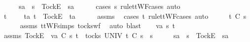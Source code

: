 \ \ \isamarkupfalse%
\ \isamarkupfalse%
\ s{}{\isacharprime}a\ \ {\isachardoublequoteopen}s{}{\isacharprime}\ {\isacharequal}\ {\isacharbrackleft}Tock{\isacharbrackright}\isactrlsub E\ {\isacharhash}\ s{}{\isacharprime}a{\isachardoublequoteclose}\isanewline
\ \ \ \ \isamarkupfalse%
\ {\isacharparenleft}cases\ s{}{\isacharprime}\ rule{\isacharcolon}ttWF{\isachardot}cases{\isacharcomma}\ auto{\isacharparenright}\isanewline
\ \ \isamarkupfalse%
\ \isamarkupfalse%
\ {\isachardoublequoteopen}t\ {\isacharequal}\ {\isacharbrackleft}{\isacharbrackright}\ {\isasymor}\ {\isacharparenleft}{\isasymexists}\ ta{\isachardot}\ t\ {\isacharequal}\ {\isacharbrackleft}Tock{\isacharbrackright}\isactrlsub E\ {\isacharhash}\ ta{\isacharparenright}{\isachardoublequoteclose}\isanewline
\ \ \ \ \isamarkupfalse%
\ assms{\isacharparenleft}{}{\isacharparenright}\ \isamarkupfalse%
\ {\isacharparenleft}cases\ t\ rule{\isacharcolon}ttWF{\isachardot}cases{\isacharcomma}\ auto{\isacharparenright}\isanewline
\ \ \isamarkupfalse%
\ \isamarkupfalse%
\ {\isachardoublequoteopen}t\ {\isasymle}\isactrlsub C\ s{}{\isacharprime}{\isachardoublequoteclose}\isanewline
\ \ \ \ \isamarkupfalse%
\ assms{\isacharparenleft}{}{\isacharparenright}\ ttWF{\isachardot}simps{\isacharparenleft}{}{\isacharparenright}\ tocks{\isacharunderscore}wf\ \isamarkupfalse%
\ {\isacharparenleft}auto{\isacharcomma}\ blast{\isacharparenright}\isanewline
{}\isamarkupfalse%
\isanewline
\ \ \isamarkupfalse%
\ va\ s{}{\isacharprime}\ t\isanewline
\ \ \isamarkupfalse%
\ assms{\isacharcolon}\ {\isachardoublequoteopen}{\isacharbrackleft}Tock{\isacharbrackright}\isactrlsub E\ {\isacharhash}\ va\ {\isasymsubseteq}\isactrlsub C\ s{}{\isacharprime}{\isachardoublequoteclose}\ {\isachardoublequoteopen}t\ {\isasymin}\ tocks\ UNIV{\isachardoublequoteclose}\ {\isachardoublequoteopen}t\ {\isasymle}\isactrlsub C\ s{}{\isacharprime}\ {\isacharat}\ s{}{\isachardoublequoteclose}\isanewline
\ \ \isamarkupfalse%
\ \isamarkupfalse%
\ s{}{\isacharprime}a\ \ {\isachardoublequoteopen}s{}{\isacharprime}\ {\isacharequal}\ {\isacharbrackleft}Tock{\isacharbrackright}\isactrlsub E\ {\isacharhash}\ s{}{\isacharprime}a{\isachardoublequoteclose}\isanewline
